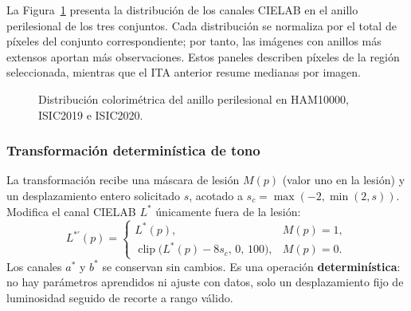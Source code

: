 La Figura~\ref{fig:cielab-anillo} presenta la distribución de los canales CIELAB en el anillo perilesional de los tres conjuntos. Cada distribución se normaliza por el total de píxeles del conjunto correspondiente; por tanto, las imágenes con anillos más extensos aportan más observaciones. Estos paneles describen píxeles de la región seleccionada, mientras que el ITA anterior resume medianas por imagen.

\begin{figure}[!htbp]
\caption[Distribución CIELAB del anillo perilesional.]{Distribución colorimétrica del anillo perilesional en HAM10000, ISIC2019 e ISIC2020.}
\label{fig:cielab-anillo}
\centering

\par\smallskip
\begingroup\footnotesize\singlespacing\raggedright
\par{}
\par\endgroup
\end{figure}

\subsubsection{Transformación determinística de tono}

La transformación recibe una máscara de lesión $M(p)$ (valor uno en la lesión) y un desplazamiento entero solicitado $s$, acotado a $s_c=\max(-2,\min(2,s))$. Modifica el canal CIELAB $L^*$ únicamente fuera de la lesión:
\begin{equation}
 L^{*\prime}(p)=\begin{cases}
 L^*(p), & M(p)=1,\\
 \operatorname{clip}\big(L^*(p)-8s_c,\,0,\,100\big), & M(p)=0.
 \end{cases}
\end{equation}
Los canales $a^*$ y $b^*$ se conservan sin cambios. Es una operación \textbf{determinística}: no hay parámetros aprendidos ni ajuste con datos, solo un desplazamiento fijo de luminosidad seguido de recorte a rango válido.

